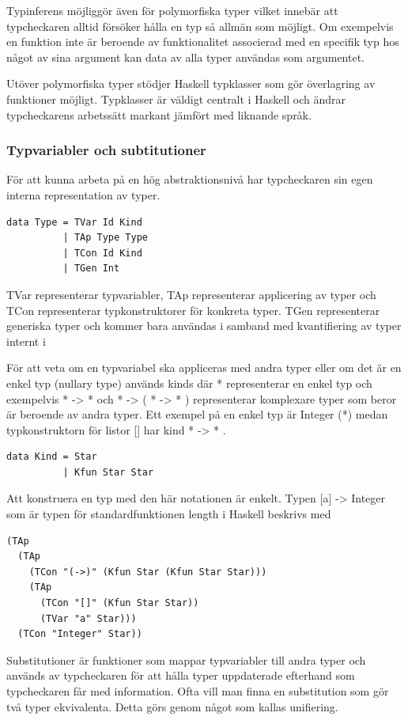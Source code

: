 Typinferens möjliggör även för polymorfiska typer vilket innebär att
typcheckaren alltid försöker hålla en typ så allmän som möjligt. Om
exempelvis en funktion inte är beroende av funktionalitet associerad med en
specifik typ hos något av sina argument kan data av alla typer användas som
argumentet.

Utöver polymorfiska typer stödjer Haskell typklasser som gör överlagring av
funktioner möjligt. Typklasser är väldigt centralt i Haskell och ändrar
typcheckarens arbetssätt markant jämfört med liknande språk.

\subsubsection{Typvariabler och subtitutioner}
För att kunna arbeta på en hög abstraktionsnivå har typcheckaren sin egen
interna representation av typer.

\begin{lstlisting}
data Type = TVar Id Kind
          | TAp Type Type
          | TCon Id Kind
          | TGen Int     
\end{lstlisting}

TVar representerar typvariabler, TAp representerar applicering av typer och
TCon representerar typkonstruktorer för konkreta typer. TGen representerar
generiska typer och kommer bara användas i samband med kvantifiering av
typer internt i 

För att veta om en typvariabel ska appliceras med andra typer eller om det
är en enkel typ (nullary type) används kinds där * representerar en enkel
typ och exempelvis * -> * och * -> ( * -> * ) representerar komplexare
typer som beror är beroende av andra typer. Ett exempel på en enkel typ är
Integer (*) medan typkonstruktorn för listor [] har kind * -> * .

\begin{lstlisting}
data Kind = Star
          | Kfun Star Star
\end{lstlisting}

Att konstruera en typ med den här notationen är enkelt. Typen [a] ->
Integer som är typen för standardfunktionen length i Haskell beskrivs med
\begin{lstlisting}
(TAp
  (TAp
    (TCon "(->)" (Kfun Star (Kfun Star Star)))
    (TAp
      (TCon "[]" (Kfun Star Star))
      (TVar "a" Star)))
  (TCon "Integer" Star))
\end{lstlisting}

Substitutioner är funktioner som mappar typvariabler till andra typer och
används av typcheckaren för att hålla typer uppdaterade efterhand som
typcheckaren får med information. Ofta vill man finna en substitution som gör
två typer ekvivalenta. Detta görs genom något som kallas unifiering.

